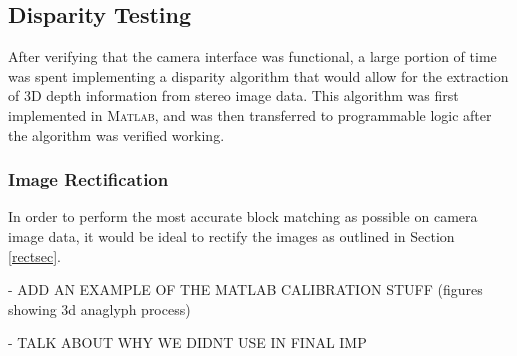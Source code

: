 \subsection{Disparity Testing}
After verifying that the camera interface was functional, a large portion of time was spent implementing a disparity algorithm that would allow for the extraction of 3D depth information from stereo image data. This algorithm was first implemented in \textsc{Matlab}, and was then transferred to programmable logic after the algorithm was verified working. 
\subsubsection{Image Rectification}
In order to perform the most accurate block matching as possible on camera image data, it would be ideal to rectify the images as outlined in Section \ref{rectsec}. 
\par
- ADD AN EXAMPLE OF THE MATLAB CALIBRATION STUFF (figures showing 3d anaglyph process)\par
- TALK ABOUT WHY WE DIDNT USE IN FINAL IMP



